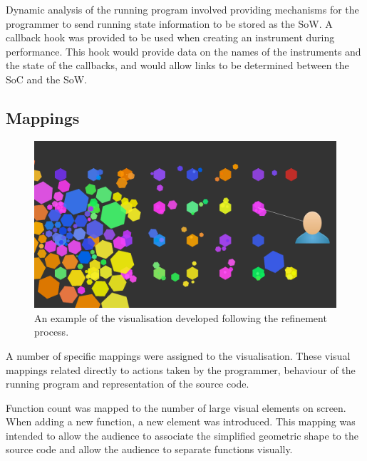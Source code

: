 Dynamic analysis of the running program involved providing mechanisms for the programmer to send running state information to be stored as the \ac{SoW}. A callback hook was provided to be used when creating an instrument during performance. This hook would provide data on the names of the instruments and the state of the callbacks, and would allow links to be determined between the \ac{SoC} and the \ac{SoW}.

\subsection{Mappings}

\begin{figure}
\centering
\includegraphics[width=\textwidth]{../images/final-visualisations/final-code-visualisation.png}
\caption{An example of the visualisation developed following the refinement process.}
\label{fig:final-visualisation}
\end{figure}

A number of specific mappings were assigned to the visualisation. These visual mappings related directly to actions taken by the programmer, behaviour of the running program and representation of the source code. 

Function count was mapped to the number of large visual elements on screen. When adding a new function, a new element was introduced. This mapping was intended to allow the audience to associate the simplified geometric shape to the source code and allow the audience to separate functions visually.

